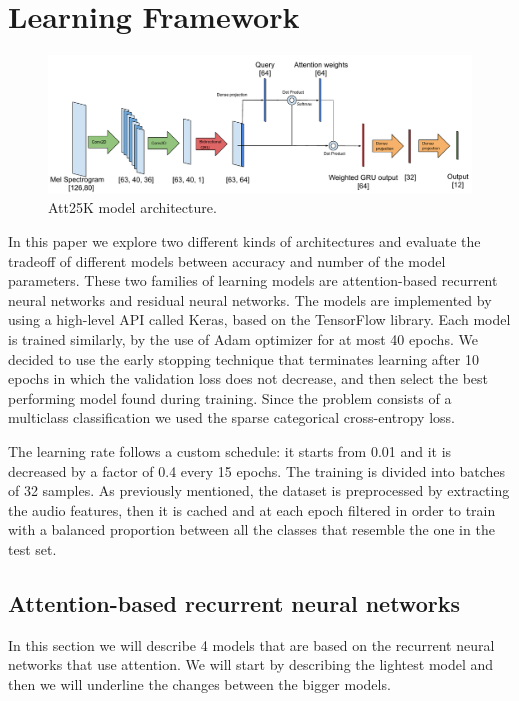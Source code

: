 \section{Learning Framework}
\label{sec:learning_framework}

\begin{figure}[htbp]
\centerline{\includegraphics[scale=.5]{att.pdf}}
\caption{Att25K model architecture.}
\label{fig}
\end{figure}


In this paper we explore two different kinds of architectures and evaluate the tradeoff of different models between accuracy and number of the model parameters. These two families of learning models are attention-based recurrent neural networks and residual neural networks.
The models are implemented by using a high-level API called Keras, based on the TensorFlow library.
Each model is trained similarly, by the use of Adam optimizer \cite{8} for at most 40 epochs. We decided to use the early stopping technique that terminates learning after 10 epochs in which the validation loss does not decrease, and then select the best performing model found during training. Since the problem consists of a multiclass classification we used the sparse categorical cross-entropy loss.


The learning rate follows a custom schedule: it starts from 0.01 and it is decreased by a factor of 0.4 every 15 epochs. The training is divided into batches of 32 samples. As previously mentioned, the dataset is preprocessed by extracting the audio features, then it is cached and at each epoch filtered in order to train with a balanced proportion between all the classes that resemble the one in the test set.



\subsection{Attention-based recurrent neural networks} 
In this section we will describe 4 models that are based on the recurrent neural networks that use attention. We will start by describing the lightest model and then we will underline the changes between the bigger models.

